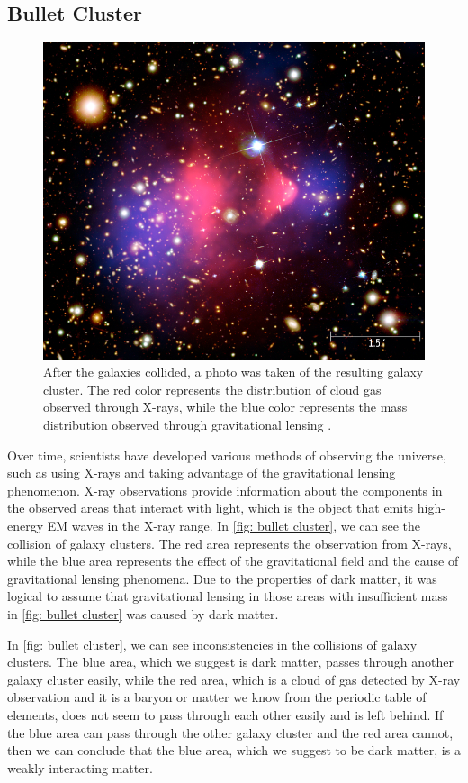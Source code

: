 \documentclass[10pt, oneside]{book}
\numberwithin{equation}{chapter}
\begin{document}
\subsection{Bullet Cluster}
\begin{figure}[h]
    \centering
    \includegraphics[width=0.5\linewidth]{images/bullet cluster.png}
    \caption{After the galaxies collided, a photo was taken of the resulting galaxy cluster. The red color represents the distribution of cloud gas observed through X-rays, while the blue color represents the mass distribution observed through gravitational lensing \cite{nasa_svs_2023}.}
    \label{fig: bullet cluster}
\end{figure}
Over time, scientists have developed various methods of observing the universe, such as using X-rays and taking advantage of the gravitational lensing phenomenon. X-ray observations provide information about the components in the observed areas that interact with light, which is the object that emits high-energy EM waves in the X-ray range. In \autoref{fig: bullet cluster}, we can see the collision of galaxy clusters. The red area represents the observation from X-rays, while the blue area represents the effect of the gravitational field and the cause of gravitational lensing phenomena. Due to the properties of dark matter, it was logical to assume that gravitational lensing in those areas with insufficient mass in \autoref{fig: bullet cluster} was caused by dark matter.

In \autoref{fig: bullet cluster}, we can see inconsistencies in the collisions of galaxy clusters. The blue area, which we suggest is dark matter, passes through another galaxy cluster easily, while the red area, which is a cloud of gas detected by X-ray observation and it is a baryon or matter we know from the periodic table of elements, does not seem to pass through each other easily and is left behind. If the blue area can pass through the other galaxy cluster and the red area cannot, then we can conclude that the blue area, which we suggest to be dark matter, is a weakly interacting matter.
\end{document}
